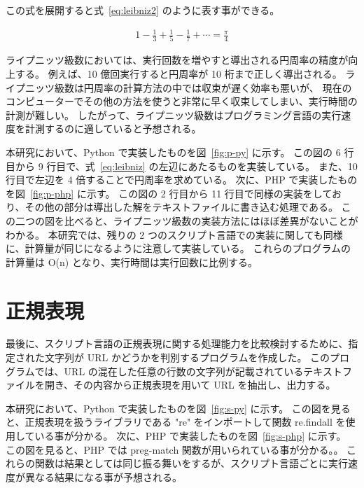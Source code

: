 この式を展開すると式~\ref{eq:leibniz2} のように表す事ができる。

\begin{eqnarray} \label{eq:leibniz2}
1-\frac{1}{3}+\frac{1}{5}-\frac{1}{7}+\cdots=\frac{\pi}{4}
\end{eqnarray}

ライプニッツ級数においては、実行回数を増やすと導出される円周率の精度が向上する。
例えば、10 億回実行すると円周率が 10 桁まで正しく導出される。
ライプニッツ級数は円周率の計算方法の中では収束が遅く効率も悪いが、
現在のコンピューターでその他の方法を使うと非常に早く収束してしまい、実行時間の計測が難しい。
したがって、ライプニッツ級数はプログラミング言語の実行速度を計測するのに適していると予想される。

本研究において、Python で実装したものを図~\ref{fig:p-py} に示す。
この図の 6 行目から 9 行目で、式~\ref{eq:leibniz} の左辺にあたるものを実装している。
また、10 行目で左辺を 4 倍することで円周率を求めている。
次に、PHP で実装したものを図~\ref{fig:p-php} に示す。
この図の 2 行目から 11 行目で同様の実装をしており、その他の部分は導出した解をテキストファイルに書き込む処理である。
この二つの図を比べると、ライプニッツ級数の実装方法にはほぼ差異がないことがわかる。
本研究では、残りの 2 つのスクリプト言語での実装に関しても同様に、計算量が同じになるように注意して実装している。
これらのプログラムの計算量は O(n) となり、実行時間は実行回数に比例する。

\section{正規表現}
\label{cha:program:regex}

最後に、スクリプト言語の正規表現に関する処理能力を比較検討するために、指定された文字列が URL かどうかを判別するプログラムを作成した。
このプログラムでは、URL の混在した任意の行数の文字列が記載されているテキストファイルを開き、その内容から正規表現を用いて URL を抽出し、出力する。

本研究において、Python で実装したものを図~\ref{fig:s-py} に示す。
この図を見ると、正規表現を扱うライブラリである "re" をインポートして関数 re.findall を使用している事が分かる。
次に、PHP で実装したものを図~\ref{fig:s-php} に示す。
この図を見ると、PHP では preg-match 関数が用いられている事が分かる。。
これらの関数は結果としては同じ振る舞いをするが、スクリプト言語ごとに実行速度が異なる結果になる事が予想される。

